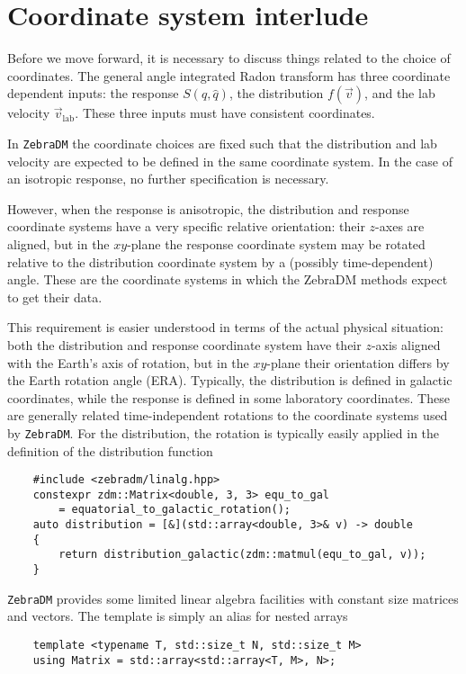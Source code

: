 \documentclass{article}
\newcommand{\unitv}[1]{\hat{#1}}
\begin{document}
\section{Coordinate system interlude}

Before we move forward, it is necessary to discuss things related to the choice of coordinates. The general angle integrated Radon transform has three coordinate dependent inputs: the response $S(q,\unitv{q})$, the distribution $f(\vec{v})$, and the lab velocity $\vec{v}_\text{lab}$. These three inputs must have consistent coordinates.

In \texttt{ZebraDM} the coordinate choices are fixed such that the distribution and lab velocity are expected to be defined in the same coordinate system. In the case of an isotropic response, no further specification is necessary. 

However, when the response is anisotropic, the distribution and response coordinate systems have a very specific relative orientation: their $z$-axes are aligned, but in the $xy$-plane the response coordinate system may be rotated relative to the distribution coordinate system by a (possibly time-dependent) angle. These are the coordinate systems in which the ZebraDM methods expect to get their data.

This requirement is easier understood in terms of the actual physical situation: both the distribution and response coordinate system have their $z$-axis aligned with the Earth's axis of rotation, but in the $xy$-plane their orientation differs by the Earth rotation angle (ERA). Typically, the distribution is defined in galactic coordinates, while the response is defined in some laboratory coordinates. These are generally related time-independent rotations to the coordinate systems used by \texttt{ZebraDM}. For the distribution, the rotation is typically easily applied in the definition of the distribution function
\begin{verbatim}
    #include <zebradm/linalg.hpp>
    constexpr zdm::Matrix<double, 3, 3> equ_to_gal
        = equatorial_to_galactic_rotation();
    auto distribution = [&](std::array<double, 3>& v) -> double
    {
        return distribution_galactic(zdm::matmul(equ_to_gal, v));
    }
\end{verbatim}
\texttt{ZebraDM} provides some limited linear algebra facilities with constant size matrices and vectors. The template  is simply an alias for nested arrays
\begin{verbatim}
    template <typename T, std::size_t N, std::size_t M>
    using Matrix = std::array<std::array<T, M>, N>;
\end{verbatim}
\end{document}
